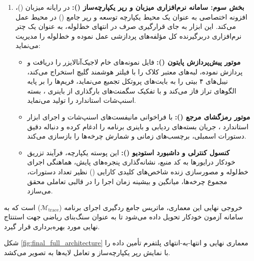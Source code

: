 \begin{enumerate}
    \item \textbf{بخش سوم: سامانه نرم‌افزاری میزبان و رپر یکپارچه‌ساز ():}
    در رایانه میزبان ()، افزونه اختصاصی  به عنوان یک محیط یکپارچه توسعه و رپر جامع () در محیط  عمل می‌کند. این ابزار به جای قرارگیری صرف در انتهای خط‌لوله، به عنوان یک چتر نرم‌افزاری دربرگیرنده کل مؤلفه‌های پردازشی عمل نموده و خط‌لوله را مدیریت می‌نماید:
    \begin{itemize}
        \item \textbf{موتور پیش‌پردازش پایتون ():} فایل نمونه‌های خام لاجیک‌آنالایزر را دریافت و پردازش نموده، لبه‌های معتبر کلاک را با فیلتر هوشمند گلیچ استخراج می‌کند، نیبل‌های ۴ بیتی را به بایت‌های پروتکل تجمیع می‌نماید، فریم‌ها را بر پایه الگوهای  تراز فاز می‌کند و با تفکیک سگمنت‌های بارگذاری از باینری ، بسته اسنپ‌شات استاندارد  را تولید می‌نماید.
        \item \textbf{موتور رمزگشای مرجع ():} با فراخوانی مانیفست‌های اسنپ‌شات و اجرای ابزار استاندارد ، جریان بسته‌های ردیابی و باینری برنامه را ادغام کرده و دنباله دقیق دستورات اسمبلی، برچسب‌های زمانی و شمارش چرخه‌ها را بازسازی می‌کند.
        \item \textbf{کنسول کنترلی و داشبورد استودیو ():} این پوسته یکپارچه، فرآیند تزریق خودکار درایورها به کد منبع، نشانه‌گذاری پنجره‌های پایش، هماهنگی اجرای خط‌لوله و مصورسازی زنده شاخص‌های کلیدی کارایی () نظیر تعداد دستورات، مجموع چرخه‌ها، میانگین  و بیشینه زمان اجرا را در قالبی تعاملی محقق می‌سازد.
    \end{itemize}
\end{enumerate}

خروجی نهایی این معماری، ماتریس جامع ردگیری اجرای برنامه ($\mathcal{M}_{\mathrm{trace}}$) است که به سامانه آزمون خودکار تحویل داده می‌شود تا به عنوان سنگ‌بنای ریاضی جهت استنتاج نهایی  مورد بهره‌برداری قرار گیرد.

شکل \ref{fig:final_full_architecture} معماری نهایی و انتها-به-انتهای پلتفرم تأمین داده را با نمایش رپر یکپارچه‌ساز  و تعامل لایه‌ها به تصویر می‌کشد.


